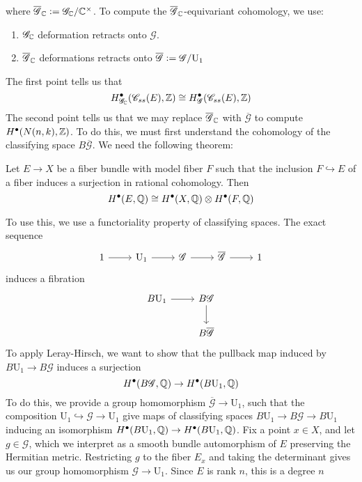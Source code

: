 where $\overline{\mathscr{G}}_{\mathbb{C}} \vcentcolon= \mathscr{G}_{\mathbb{C}}/\mathbb{C}^\times$. To
compute the $\overline{\mathscr{G}}_{\mathbb{C}}$-equivariant cohomology, we use:
\begin{enumerate}
  \item $\mathscr{G}_{\mathbb{C}}$ deformation retracts onto $\mathscr{G}$.
  \item $\overline{\mathscr{G}}_{\mathbb{C}}$ deformations retracts onto
  $\overline{\mathscr{G}} \vcentcolon= \mathscr{G}/\mathrm{U}_1$
\end{enumerate}
The first point tells us that
\[
H^\bullet_{\mathscr{G}_{\mathbb{C}}}(\mathscr{C}_{ss}(E),\mathbb{Z})
\cong H^\bullet_\mathscr{G}(\mathscr{C}_{ss}(E),\mathbb{Z})
\]
The second point tells us that we may replace $\overline{\mathscr{G}}_{\mathbb{C}}$ with
$\overline{\mathscr{G}}$ to compute $H^\bullet(N(n,k),\mathbb{Z})$. To do this, we
must first understand the cohomology of the classifying space
$B\overline{\mathscr{G}}$. We need the following theorem:
%
\begin{thm}
Let $E \to X$ be a fiber bundle with model fiber $F$ such that
the inclusion $F \hookrightarrow E$ of a fiber induces a surjection
in rational cohomology. Then
\[
H^\bullet(E,\mathbb{Q}) \cong H^\bullet(X,\mathbb{Q}) \otimes H^\bullet(F,\mathbb{Q})
\]
\end{thm}
%
To use this, we use a functoriality property of classifying spaces.
The exact sequence
\[\begin{tikzcd}
1 \ar[r] & \mathrm{U}_1 \ar[r] & \mathscr{G} \ar[r] & \overline{\mathscr{G}} \ar[r] & 1
\end{tikzcd}\]
induces a fibration
\[\begin{tikzcd}
B \mathrm{U}_1 \ar[r] & B\mathscr{G} \ar[d] \\
& B\overline{\mathscr{G}}
\end{tikzcd}\]
To apply Leray-Hirsch, we want to show that the pullback map induced
by $B \mathrm{U}_1 \to B\mathscr{G}$ induces a surjection
\[
H^\bullet(B\mathscr{G},\mathbb{Q}) \to H^\bullet(B \mathrm{U}_1, \mathbb{Q})
\]
To do this, we provide a group homomorphism $\overline{\mathscr{G}} \to \mathrm{U}_1$,
such that the composition $\mathrm{U}_1 \hookrightarrow \mathscr{G} \to \mathrm{U}_1$
give maps of classifying spaces $B\mathrm{U}_1 \to B\mathscr{G} \to B\mathrm{U}_1$
inducing an isomorphism $H^\bullet(B \mathrm{U}_1,\mathbb{Q}) \to H^\bullet(B \mathrm{U}_1,\mathbb{Q})$.
Fix a point $x \in X$, and let $g \in \mathscr{G}$, which we interpret as a
smooth bundle automorphism of $E$ preserving the Hermitian metric. Restricting $g$
to the fiber $E_x$ and taking the determinant gives us our group homomorphism
$\mathscr{G} \to \mathrm{U}_1$. Since $E$ is rank $n$, this is a degree $n$
